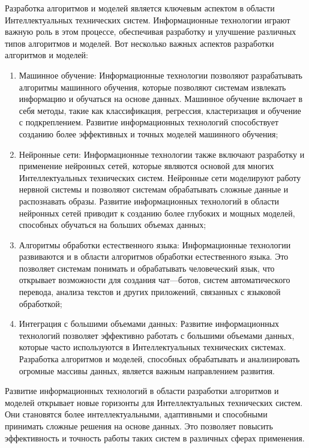     Разработка алгоритмов и моделей является ключевым аспектом в области Интеллектуальных технических систем. Информационные технологии играют важную роль в этом процессе, обеспечивая разработку и улучшение различных типов алгоритмов и моделей. Вот несколько важных аспектов разработки алгоритмов и моделей:
    \begin{enumerate}
        \item Машинное обучение: Информационные технологии позволяют разрабатывать алгоритмы машинного обучения, которые позволяют системам извлекать информацию и обучаться на основе данных. Машинное обучение включает в себя методы, такие как классификация, регрессия, кластеризация и обучение с подкреплением. Развитие информационных технологий способствует созданию более эффективных и точных моделей машинного обучения;
        \item Нейронные сети: Информационные технологии также включают разработку и применение нейронных сетей, которые являются основой для многих Интеллектуальных технических систем. Нейронные сети моделируют работу нервной системы и позволяют системам обрабатывать сложные данные и распознавать образы. Развитие информационных технологий в области нейронных сетей приводит к созданию более глубоких и мощных моделей, способных обучаться на больших объемах данных;
        \item Алгоритмы обработки естественного языка: Информационные технологии развиваются и в области алгоритмов обработки естественного языка. Это позволяет системам понимать и обрабатывать человеческий язык, что открывает возможности для создания чат—ботов, систем автоматического перевода, анализа текстов и других приложений, связанных с языковой обработкой;
        \item Интеграция с большими объемами данных: Развитие информационных технологий позволяет эффективно работать с большими объемами данных, которые часто используются в Интеллектуальных технических системах. Разработка алгоритмов и моделей, способных обрабатывать и анализировать огромные массивы данных, является важным направлением развития.
    \end{enumerate}

    Развитие информационных технологий в области разработки алгоритмов и моделей открывает новые горизонты для Интеллектуальных технических систем. Они становятся более интеллектуальными, адаптивными и способными принимать сложные решения на основе данных. Это позволяет повысить эффективность и точность работы таких систем в различных сферах применения.

